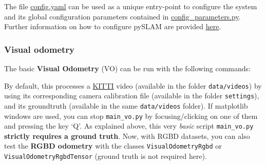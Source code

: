 \documentclass{article}
\newenvironment{Shaded}{\begin{snugshade}}{\end{snugshade}}
\newcommand{\BuiltInTok}[1]{\textcolor[rgb]{0.74,0.68,0.62}{#1}}
\newcommand{\CommentTok}[1]{\textcolor[rgb]{0.00,0.40,1.00}{\textbf{\textit{#1}}}}
\newcommand{\ExtensionTok}[1]{\textcolor[rgb]{0.74,0.68,0.62}{#1}}
\newcommand{\NormalTok}[1]{\textcolor[rgb]{0.74,0.68,0.62}{#1}}
\begin{document}
\begin{scriptsize}
\begin{Shaded}
\end{Shaded}
\end{scriptsize}

The file \href{./config.yaml}{config.yaml} can be used as a unique
entry-point to configure the system and its global configuration
parameters contained in
\href{./config_parameters.py}{config\_parameters.py}. Further
information on how to configure pySLAM are provided
\protect\hyperlink{selecting-a-dataset-and-different-configuration-parameters}{here}.


\hypertarget{visual-odometry}{%
\subsubsection{Visual odometry}\label{visual-odometry}}

The basic \textbf{Visual Odometry} (VO) can be run with the following
commands:

\begin{scriptsize}
\begin{Shaded}
\end{Shaded}
\end{scriptsize}


By default, this processes a
\href{http://www.cvlibs.net/datasets/kitti/eval_odometry.php}{KITTI}
video (available in the folder \texttt{data/videos}) by using its
corresponding camera calibration file (available in the folder
\texttt{settings}), and its groundtruth (available in the same
\texttt{data/videos} folder). If matplotlib windows are used, you can
stop \texttt{main\_vo.py} by focusing/clicking on one of them and
pressing the key `Q'. As explained above, this very \emph{basic} script
\texttt{main\_vo.py} \textbf{strictly requires a ground truth}. Now,
with RGBD datasets, you can also test the \textbf{RGBD odometry} with
the classes \texttt{VisualOdometryRgbd} or
\texttt{VisualOdometryRgbdTensor} (ground truth is not required here).
\end{document}
